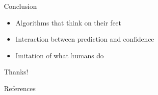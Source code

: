 \documentclass[compress]{beamer}
\begin{document}
\begin{frame}{Conclusion}

  \begin{itemize}
    \item Algorithms that think on their feet
    \item Interaction between prediction and confidence
    \item Imitation of what humans do
  \end{itemize}

\end{frame}

\begin{frame}{Thanks!}

\end{frame}

\begin{frame}{References}

\tiny

\end{frame}




	
\end{document}
